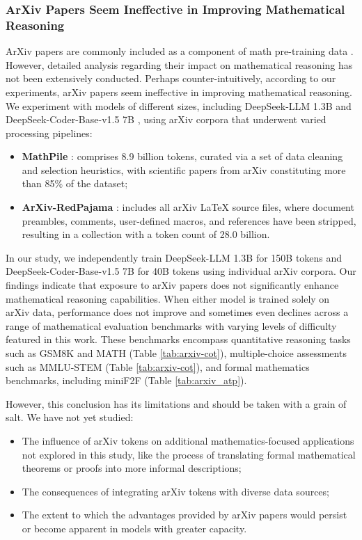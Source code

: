 \begin{itemize}[topsep=0pt]
\begin{itemize}[topsep=0pt]
\subsubsection{ArXiv Papers Seem Ineffective in Improving Mathematical Reasoning}

ArXiv papers are commonly included as a component of math pre-training data \citep{minerva,gpt-f,llemma,mathpile}. However, detailed analysis regarding their impact on mathematical reasoning has not been extensively conducted. Perhaps counter-intuitively, according to our experiments, arXiv papers seem ineffective in improving mathematical reasoning. We experiment with models of different sizes, including DeepSeek-LLM 1.3B and DeepSeek-Coder-Base-v1.5 7B \citep{deepseek-coder}, using arXiv corpora that underwent varied processing pipelines:

\begin{itemize}[topsep=0pt]
    \item \textbf{MathPile} \citep{mathpile}: comprises 8.9 billion tokens, curated via a set of data cleaning and selection heuristics, with scientific papers from arXiv constituting more than 85\% of the dataset;
    \item \textbf{ArXiv-RedPajama} \citep{redpajama}: includes all arXiv LaTeX source files, where document preambles, comments, user-defined macros, and references have been stripped, resulting in a collection with a token count of 28.0 billion.
\end{itemize}

In our study, we independently train DeepSeek-LLM 1.3B for 150B tokens and DeepSeek-Coder-Base-v1.5 7B for 40B tokens using individual arXiv corpora. Our findings indicate that exposure to arXiv papers does not significantly enhance mathematical reasoning capabilities. When either model is trained solely on arXiv data, performance does not improve and sometimes even declines across a range of mathematical evaluation benchmarks with varying levels of difficulty featured in this work. These benchmarks encompass quantitative reasoning tasks such as GSM8K and MATH (Table \ref{tab:arxiv-cot}), multiple-choice assessments such as MMLU-STEM (Table \ref{tab:arxiv-cot}), and formal mathematics benchmarks, including miniF2F (Table \ref{tab:arxiv_atp}).

However, this conclusion has its limitations and should be taken with a grain of salt. We have not yet studied:

\begin{itemize}[topsep=0pt]
    \item The influence of arXiv tokens on additional mathematics-focused applications not explored in this study, like the process of translating formal mathematical theorems or proofs into more informal descriptions;
    \item The consequences of integrating arXiv tokens with diverse data sources;
    \item The extent to which the advantages provided by arXiv papers would persist or become apparent in models with greater capacity.
\end{itemize}


\end{itemize}
\end{itemize}
